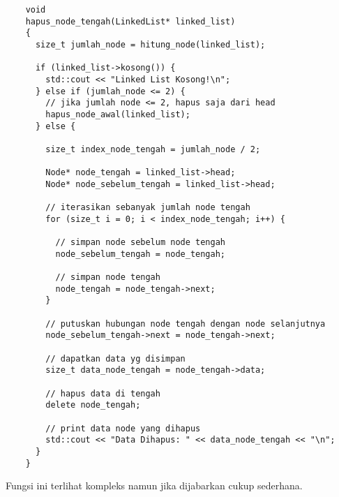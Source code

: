 \documentclass[12pt, a4paper]{article}
\begin{document}
  \vspace{0.5cm}
  \begin{lstlisting}
    void
    hapus_node_tengah(LinkedList* linked_list)
    {
      size_t jumlah_node = hitung_node(linked_list);

      if (linked_list->kosong()) {
        std::cout << "Linked List Kosong!\n";
      } else if (jumlah_node <= 2) {
        // jika jumlah node <= 2, hapus saja dari head
        hapus_node_awal(linked_list);
      } else {

        size_t index_node_tengah = jumlah_node / 2;

        Node* node_tengah = linked_list->head;
        Node* node_sebelum_tengah = linked_list->head;

        // iterasikan sebanyak jumlah node tengah
        for (size_t i = 0; i < index_node_tengah; i++) {

          // simpan node sebelum node tengah
          node_sebelum_tengah = node_tengah;

          // simpan node tengah
          node_tengah = node_tengah->next;
        }

        // putuskan hubungan node tengah dengan node selanjutnya
        node_sebelum_tengah->next = node_tengah->next;

        // dapatkan data yg disimpan
        size_t data_node_tengah = node_tengah->data;

        // hapus data di tengah
        delete node_tengah;

        // print data node yang dihapus
        std::cout << "Data Dihapus: " << data_node_tengah << "\n";
      }
    }
  \end{lstlisting}
  \vspace{0.5cm}

  Fungsi ini terlihat kompleks namun jika dijabarkan cukup sederhana.
\end{document}
